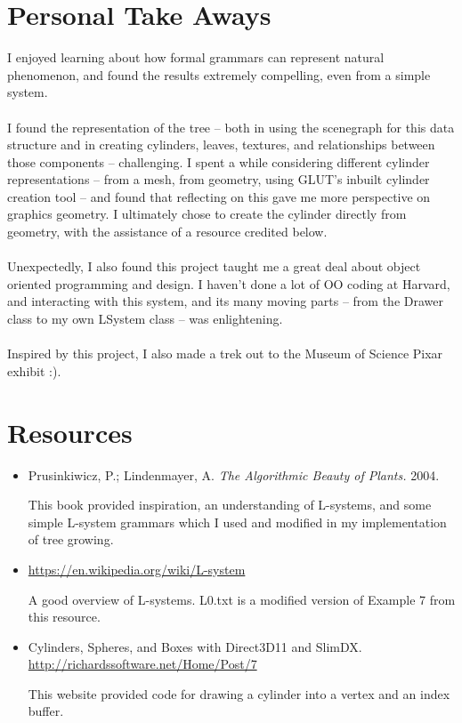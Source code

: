 \documentclass[11pt]{article} %
\begin{document}
\section{Personal Take Aways} 
I enjoyed learning about how formal grammars can represent natural phenomenon, and found the results extremely compelling, even from a simple system. 
\\ \\ 
\noindent I found the representation of the tree -- both in using the scenegraph for this data structure and in creating cylinders, leaves, textures, and relationships between those components -- challenging. I spent a while considering different cylinder representations -- from a mesh, from geometry, using GLUT's inbuilt cylinder creation tool -- and found that reflecting on this gave me more perspective on graphics geometry. I ultimately chose to create the cylinder directly from geometry, with the assistance of a resource credited below. 
\\ \\ 
\noindent Unexpectedly, I also found this project taught me a great deal about object oriented programming and design. I haven't done a lot of OO coding at Harvard, and interacting with this system, and its many moving parts -- from the Drawer class to my own LSystem class -- was enlightening. 
\\ \\ 
\noindent Inspired by this project, I also made a trek out to the Museum of Science Pixar exhibit :). 

\section{Resources} 

\begin{itemize} 

\item Prusinkiwicz, P.; Lindenmayer, A. \emph{The Algorithmic Beauty of Plants.} 2004. 

This book provided inspiration, an understanding of L-systems, and some simple L-system grammars which I used and modified in my implementation of tree growing. 

\item \url{https://en.wikipedia.org/wiki/L-system} 

A good overview of L-systems. L0.txt is a modified version of Example 7 from this resource.

\item  Cylinders, Spheres, and Boxes with Direct3D11 and SlimDX. \url{http://richardssoftware.net/Home/Post/7} 

This website provided code for drawing a cylinder into a vertex and an index buffer. 
\end{itemize} 
\end{document}
